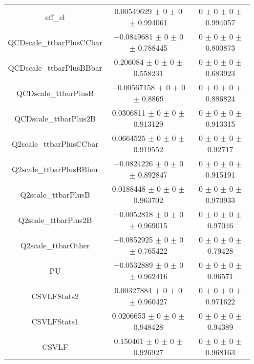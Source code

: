 \begin{table}
\begin{tabular}{ccc}
eff\_el 	& \num{0.00549629} $\pm$ \num{0} $\pm$ \num{0} $\pm$ \num{0.994061} 	& \num{0} $\pm$ \num{0} $\pm$ \num{0} $\pm$ \num{0.994057}\\
QCDscale\_ttbarPlusCCbar 	& \num{-0.0849681} $\pm$ \num{0} $\pm$ \num{0} $\pm$ \num{0.788445} 	& \num{0} $\pm$ \num{0} $\pm$ \num{0} $\pm$ \num{0.800873}\\
QCDscale\_ttbarPlusBBbar 	& \num{0.206084} $\pm$ \num{0} $\pm$ \num{0} $\pm$ \num{0.558231} 	& \num{0} $\pm$ \num{0} $\pm$ \num{0} $\pm$ \num{0.683923}\\
QCDscale\_ttbarPlusB 	& \num{-0.00567158} $\pm$ \num{0} $\pm$ \num{0} $\pm$ \num{0.8869} 	& \num{0} $\pm$ \num{0} $\pm$ \num{0} $\pm$ \num{0.886824}\\
QCDscale\_ttbarPlus2B 	& \num{0.0306811} $\pm$ \num{0} $\pm$ \num{0} $\pm$ \num{0.913129} 	& \num{0} $\pm$ \num{0} $\pm$ \num{0} $\pm$ \num{0.913315}\\
Q2scale\_ttbarPlusCCbar 	& \num{0.0664525} $\pm$ \num{0} $\pm$ \num{0} $\pm$ \num{0.919552} 	& \num{0} $\pm$ \num{0} $\pm$ \num{0} $\pm$ \num{0.92717}\\
Q2scale\_ttbarPlusBBbar 	& \num{-0.0824226} $\pm$ \num{0} $\pm$ \num{0} $\pm$ \num{0.892847} 	& \num{0} $\pm$ \num{0} $\pm$ \num{0} $\pm$ \num{0.915191}\\
Q2scale\_ttbarPlusB 	& \num{0.0188448} $\pm$ \num{0} $\pm$ \num{0} $\pm$ \num{0.963702} 	& \num{0} $\pm$ \num{0} $\pm$ \num{0} $\pm$ \num{0.970933}\\
Q2scale\_ttbarPlus2B 	& \num{-0.0052818} $\pm$ \num{0} $\pm$ \num{0} $\pm$ \num{0.969015} 	& \num{0} $\pm$ \num{0} $\pm$ \num{0} $\pm$ \num{0.97046}\\
Q2scale\_ttbarOther 	& \num{-0.0852925} $\pm$ \num{0} $\pm$ \num{0} $\pm$ \num{0.765422} 	& \num{0} $\pm$ \num{0} $\pm$ \num{0} $\pm$ \num{0.79428}\\
PU 	& \num{-0.0532889} $\pm$ \num{0} $\pm$ \num{0} $\pm$ \num{0.962416} 	& \num{0} $\pm$ \num{0} $\pm$ \num{0} $\pm$ \num{0.96571}\\
CSVLFStats2 	& \num{0.00327884} $\pm$ \num{0} $\pm$ \num{0} $\pm$ \num{0.960427} 	& \num{0} $\pm$ \num{0} $\pm$ \num{0} $\pm$ \num{0.971622}\\
CSVLFStats1 	& \num{0.0206653} $\pm$ \num{0} $\pm$ \num{0} $\pm$ \num{0.948428} 	& \num{0} $\pm$ \num{0} $\pm$ \num{0} $\pm$ \num{0.94389}\\
CSVLF 	& \num{0.150461} $\pm$ \num{0} $\pm$ \num{0} $\pm$ \num{0.926927} 	& \num{0} $\pm$ \num{0} $\pm$ \num{0} $\pm$ \num{0.968163}\\

\end{tabular}
\end{table}
